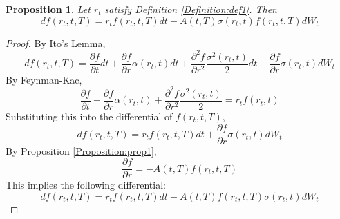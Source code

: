 \documentclass[12pt]{article}
\newtheorem{bond}{Proposition}
\theoremstyle{definition}
\theoremstyle{remark}
\begin{document}
\begin{bond}
Let \(r_t\) satisfy Definition \ref{Definition:def1}.  Then
\[df(r_t, t, T)=r_t f(r_t, t, T)dt-A(t, T) \sigma(r_t, t) f(r_t, t, T) dW_t \]
\label{Proposition:prop2}
\end{bond}
\begin{proof}
By Ito's Lemma, 
\[df(r_t, t, T)=\frac{\partial f}{\partial t}dt+\frac{\partial f}{\partial r} \alpha(r_t, t)dt+\frac{\partial^2 f}{\partial r^2} \frac{\sigma^2 (r_t, t)}{2} dt +\frac{\partial f}{\partial r} \sigma(r_t, t) dW_t \]
By Feynman-Kac, \[\frac{\partial f}{\partial t}+\frac{\partial f}{\partial r} \alpha(r_t, t)+\frac{\partial^2 f}{\partial r^2} \frac{\sigma^2 (r_t, t)}{2}=r_t f(r_t, t)\]
Substituting this into the differential of \(f(r_t, t, T)\), 
\[df(r_t, t, T)=r_tf(r_t, t, T)dt +\frac{\partial f}{\partial r} \sigma(r_t, t) dW_t\]
By Proposition \ref{Proposition:prop1}, 
\[\frac{\partial f}{\partial r}=-A(t, T) f(r_t, t, T) \]
This implies the following differential:
\[df(r_t, t, T)=r_tf(r_t, t, T)dt  -A(t, T) f(r_t, t, T)\sigma(r_t, t) dW_t\]
\end{proof}
\end{document}
